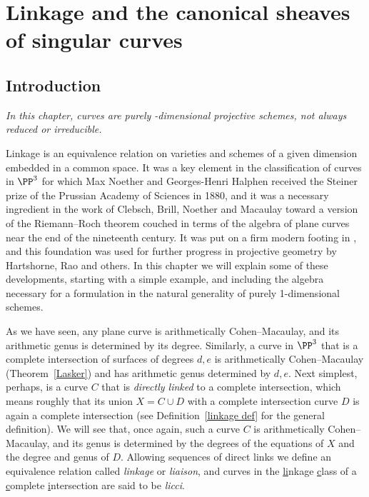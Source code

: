 
\chapter{Linkage and the canonical sheaves of singular curves}
\label{LiaisonChapter}\label{linkageChapter}\label{LinkageChapter}


\section{Introduction} \label{LinkageIntro}

\emph{In this chapter, curves are purely \1-dimensional projective
schemes, 
not always
reduced or irreducible.}

Linkage is an equivalence relation on varieties and schemes of a given
dimension embedded in a common space. It was a key element
in the classification of curves in $\PP^3$ for which
Max Noether and Georges-Henri Halphen
%
%
received the
Steiner prize
%
of the Prussian
Academy of Sciences in 1880, and it was a necessary ingredient in the
work of
Clebsch, Brill, Noether and Macaulay
toward
%
%
%
%
a version of the
Riemann--Roch theorem
couched in terms of the algebra
of plane curves near the end of the nineteenth century.
It was put on a firm modern footing in \cite{MR364271}, and this
%
%
%
%
%
%
foundation was used for further progress in projective geometry by
Hartshorne, Rao
and others. In this chapter we will explain some of
these developments, starting with a simple example,
%
and including the algebra necessary for a formulation in the natural
generality of purely 1-dimensional schemes.

As we have seen, any plane curve is
arithmetically Cohen--Macaulay,
%
and
its arithmetic genus is determined by its degree. Similarly, a curve in
$\PP^3$ that is a 
complete intersection
%
of surfaces of degrees $d,e$
is arithmetically Cohen--Macaulay (Theorem~\ref{Lasker}) and has
arithmetic genus determined by $d,e$.
Next simplest, perhaps,
%
is a curve $C$ that is
\emph{directly linked}
to a complete intersection,
which means roughly that its union $X = C\cup D$
with a complete intersection
curve $D$ is again a complete intersection
(see Definition~\ref{linkage def} for the general definition).
We will see that, once again, such a
curve $C$ is arithmetically Cohen--Macaulay,
and its genus is determined by the degrees of the equations of $X$
and the degree and genus of $D$.
Allowing sequences of direct links we define an equivalence relation
%
%
%
called  \emph{linkage} or \emph{liaison},
and curves in the \underline{li}nkage {\underline c}lass of a {\underline
c}omplete {\underline i}ntersection are
said to be
\emph{licci}.

